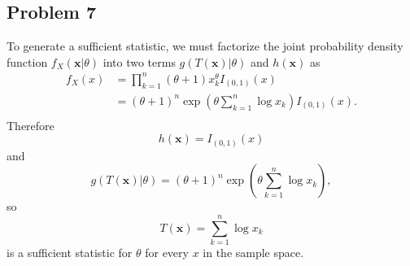 \documentclass{article}
\begin{document}
\subsection*{Problem 7}
To generate a sufficient statistic, we must factorize the joint probability density function
$f_X(\mathbf{x}|\theta)$ into two terms $g(T(\mathbf{x})|\theta)$ and $h(\mathbf{x})$ as 
\[\begin{aligned}
f_X(x) &= \prod_{k=1}^n(\theta+1)x_k^\theta I_{(0,1)}(x) \\
&= (\theta+1)^n \exp\left(\theta\sum_{k=1}^n \log{x_k}\right) I_{(0,1)}(x).\\
\end{aligned}\]
Therefore 
\[h(\mathbf{x}) = I_{(0,1)}(x)\]
and 
\[g(T(\mathbf{x})|\theta) = (\theta+1)^n \exp\left(\theta\sum_{k=1}^n \log{x_k}\right),\]
so 
\[T(\mathbf{x}) = \sum_{k=1}^n \log{x_k}\]
is a sufficient statistic for $\theta$ for every $x$ in the sample space. 

 
\end{document}
